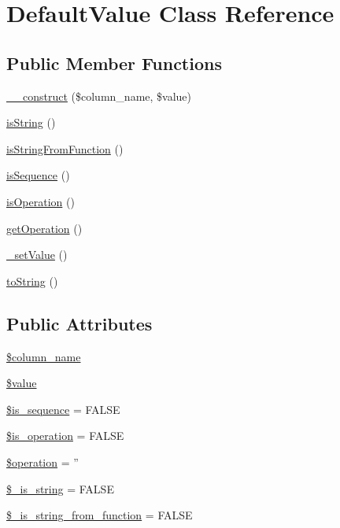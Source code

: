 \hypertarget{classDefaultValue}{\section{Default\-Value Class Reference}
\label{classDefaultValue}
}
\subsection*{Public Member Functions}
\begin{DoxyCompactItemize}
\item 
\hyperlink{classDefaultValue_ade5a52b06878afc704b60c42a2c0055c}{\-\_\-\-\_\-construct} (\$column\-\_\-name, \$value)
\item 
\hyperlink{classDefaultValue_a2ff17e887cf955aea26fbb1b3e11f491}{is\-String} ()
\item 
\hyperlink{classDefaultValue_aeef8c65be1e3cfe7459916653d6d9181}{is\-String\-From\-Function} ()
\item 
\hyperlink{classDefaultValue_a5186ba40cadb8a1740edd64665f4c126}{is\-Sequence} ()
\item 
\hyperlink{classDefaultValue_af7a051370a3b8bb17d9f9cf64a03be74}{is\-Operation} ()
\item 
\hyperlink{classDefaultValue_a1e607abe2e29a00fa3ab0cecba406776}{get\-Operation} ()
\item 
\hyperlink{classDefaultValue_a1a0d50d43f32dbb3df7e11467c6938be}{\-\_\-set\-Value} ()
\item 
\hyperlink{classDefaultValue_a0f0d4d1cc64b3bfb8d2acec2b113be4d}{to\-String} ()
\end{DoxyCompactItemize}
\subsection*{Public Attributes}
\begin{DoxyCompactItemize}
\item 
\hyperlink{classDefaultValue_a671e32e797e9975b6497a56a5ba92dc6}{\$column\-\_\-name}
\item 
\hyperlink{classDefaultValue_a963ea764e6dfb5dbfe87c4b8ffd131ac}{\$value}
\item 
\hyperlink{classDefaultValue_a7ad2c3e04c79053b6299c0fa0e35389e}{\$is\-\_\-sequence} = F\-A\-L\-S\-E
\item 
\hyperlink{classDefaultValue_ae01855465814b8be26de7bd0b33b6778}{\$is\-\_\-operation} = F\-A\-L\-S\-E
\item 
\hyperlink{classDefaultValue_a0b0e52103637bbb5ea0fdedcb0672fcd}{\$operation} = ''
\item 
\hyperlink{classDefaultValue_ac3b23483d015be5b48517fb96890b64a}{\$\-\_\-is\-\_\-string} = F\-A\-L\-S\-E
\item 
\hyperlink{classDefaultValue_a000cf284b962d5c3354abd73b611c888}{\$\-\_\-is\-\_\-string\-\_\-from\-\_\-function} = F\-A\-L\-S\-E
\end{DoxyCompactItemize}


